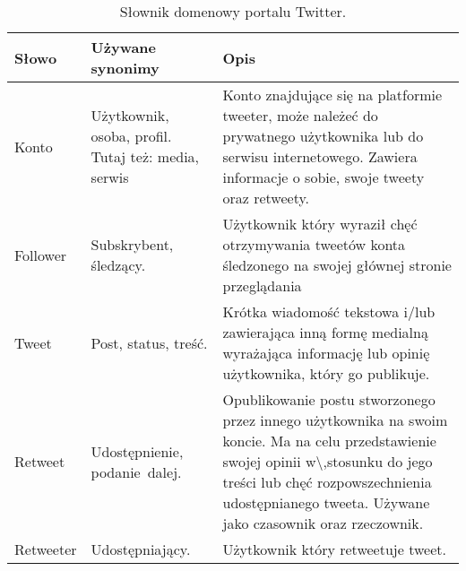 \begin{table}[!h] \label{tab:slowniktwitter} \centering
\caption{Słownik domenowy portalu Twitter.}
\begin{tabular} { | m{2cm} | m{}| m{7cm} | } \hline
Słowo & Używane synonimy & Opis \\  \hline \hline
Konto & Użytkownik, osoba,
  profil. Tutaj też: media, serwis & Konto
  znajdujące się na platformie tweeter, może należeć do prywatnego użytkownika
  lub do serwisu internetowego. Zawiera informacje o sobie, swoje tweety oraz
  retweety. \\ 
\hline
Follower & Subskrybent, śledzący. & Użytkownik który
  wyraził chęć otrzymywania tweetów konta śledzonego na swojej głównej stronie
  przeglądania \\ 
\hline
Tweet & Post, status,
  treść. & Krótka wiadomość
  tekstowa i/lub zawierająca inną formę medialną wyrażająca informację lub
  opinię użytkownika, który go publikuje. \\ 
\hline
Retweet & Udostępnienie,
  \mbox{podanie dalej.} & Opublikowanie postu
  stworzonego przez innego użytkownika na swoim koncie. Ma na celu przedstawienie
  swojej opinii w\textbackslash{},stosunku do jego treści lub chęć rozpowszechnienia
  udostępnianego tweeta. Używane jako czasownik oraz rzeczownik. \\ 
\hline
Retweeter & Udostępniający. & Użytkownik
  który retweetuje tweet. \\
\hline
\end{tabular}
\end{table}
